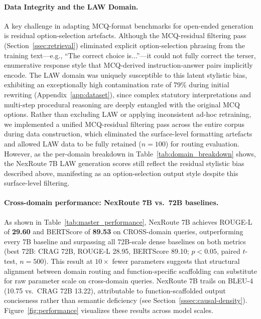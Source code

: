 \documentclass[a4paper,fleql]{cas-sc}
\begin{document}
\paragraph{Data Integrity and the LAW Domain.}
A key challenge in adapting MCQ-format benchmarks for open-ended generation
is residual option-selection artefacts. Although the MCQ-residual filtering
pass (Section~\ref{ssec:retrieval}) eliminated explicit option-selection
phrasing from the training text---e.g., ``The correct choice is...''---it
could not fully correct the terser, enumerative response style that
MCQ-derived instruction-answer pairs implicitly encode. The
LAW domain was uniquely susceptible to this latent stylistic bias, exhibiting
an exceptionally high contamination rate of 79\% during initial rewriting
(Appendix~\ref{app:dataset}), since complex statutory interpretations and
multi-step procedural reasoning are deeply entangled with the original MCQ
options. Rather than excluding LAW or applying inconsistent ad-hoc
retraining, we implemented a unified MCQ-residual filtering pass across the
entire corpus during data construction, which eliminated the surface-level
formatting artefacts and allowed LAW data to be fully retained ($n{=}100$)
for routing evaluation. However, as the per-domain breakdown in
Table~\ref{tab:domain_breakdown} shows, the NexRoute 7B LAW generation scores
still reflect the residual stylistic bias described above, manifesting as an
option-selection output style despite this surface-level filtering.

\paragraph{Cross-domain performance: NexRoute 7B vs.\ 72B baselines.}
As shown in Table~\ref{tab:master_performance}, NexRoute 7B achieves ROUGE-L
of \textbf{29.60} and BERTScore of \textbf{89.53} on CROSS-domain queries,
outperforming every 7B baseline and surpassing all 72B-scale dense baselines
on both metrics (best 72B: CRAG 72B, ROUGE-L 28.95, BERTScore 89.10;
$p<0.05$, paired $t$-test, $n{=}500$). This result at $10\times$ fewer
parameters suggests that structural alignment between domain routing and
function-specific scaffolding can substitute for raw parameter scale on
cross-domain queries. NexRoute 7B trails on BLEU-4 (10.75 vs.\ CRAG 72B
13.22), attributable to function-scaffolded output conciseness rather than
semantic deficiency (see Section~\ref{sssec:causal-density}).
Figure~\ref{fig:performance} visualizes these results across model scales.
\end{document}
